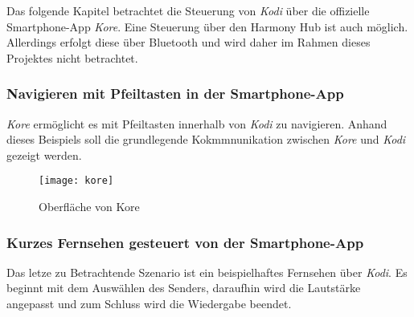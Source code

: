 Das folgende Kapitel betrachtet die Steuerung von \textit{Kodi} über die offizielle Smartphone-App \textit{Kore}.
Eine Steuerung über den Harmony Hub ist auch möglich.
Allerdings erfolgt diese über Bluetooth und wird daher im Rahmen dieses Projektes nicht betrachtet.

\subsubsection{Navigieren mit Pfeiltasten in der Smartphone-App}
\textit{Kore} ermöglicht es mit Pfeiltasten innerhalb von \textit{Kodi} zu navigieren.
Anhand dieses Beispiels soll die grundlegende Kokmmnunikation zwischen \textit{Kore} und \textit{Kodi} gezeigt werden.

\begin{figure}[h!]
    \centering
    \texttt{[image: kore]}
    \caption{Oberfläche von Kore}\label{fig:kore}
\end{figure}


\subsubsection{Kurzes Fernsehen gesteuert von der Smartphone-App}
Das letze zu Betrachtende Szenario ist ein beispielhaftes Fernsehen über \textit{Kodi}.
Es beginnt mit dem Auswählen des Senders,
daraufhin wird die Lautstärke angepasst und zum Schluss wird die Wiedergabe beendet.